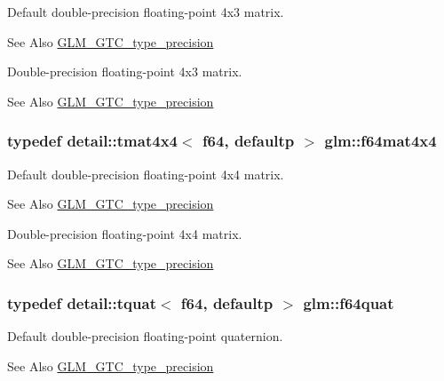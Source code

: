 Default double-\/precision floating-\/point 4x3 matrix. \begin{DoxySeeAlso}{See Also}
\hyperlink{group__gtc__type__precision}{G\-L\-M\-\_\-\-G\-T\-C\-\_\-type\-\_\-precision}
\end{DoxySeeAlso}
Double-\/precision floating-\/point 4x3 matrix. \begin{DoxySeeAlso}{See Also}
\hyperlink{group__gtc__type__precision}{G\-L\-M\-\_\-\-G\-T\-C\-\_\-type\-\_\-precision} 
\end{DoxySeeAlso}
\hypertarget{group__gtc__type__precision_ga37a1ae1f6e67b5a6a06b1ee7c83f4bec}{
\subsubsection[{f64mat4x4}]{\setlength{\rightskip}{0pt plus 5cm}typedef detail\-::tmat4x4$<$ f64, defaultp $>$ {\bf glm\-::f64mat4x4}}}\label{group__gtc__type__precision_ga37a1ae1f6e67b5a6a06b1ee7c83f4bec}
Default double-\/precision floating-\/point 4x4 matrix. \begin{DoxySeeAlso}{See Also}
\hyperlink{group__gtc__type__precision}{G\-L\-M\-\_\-\-G\-T\-C\-\_\-type\-\_\-precision}
\end{DoxySeeAlso}
Double-\/precision floating-\/point 4x4 matrix. \begin{DoxySeeAlso}{See Also}
\hyperlink{group__gtc__type__precision}{G\-L\-M\-\_\-\-G\-T\-C\-\_\-type\-\_\-precision} 
\end{DoxySeeAlso}
\hypertarget{group__gtc__type__precision_ga860589eddc4ff95795a858318652b6ff}{
\subsubsection[{f64quat}]{\setlength{\rightskip}{0pt plus 5cm}typedef detail\-::tquat$<$ f64, defaultp $>$ {\bf glm\-::f64quat}}}\label{group__gtc__type__precision_ga860589eddc4ff95795a858318652b6ff}
Default double-\/precision floating-\/point quaternion. \begin{DoxySeeAlso}{See Also}
\hyperlink{group__gtc__type__precision}{G\-L\-M\-\_\-\-G\-T\-C\-\_\-type\-\_\-precision}
\end{DoxySeeAlso}
